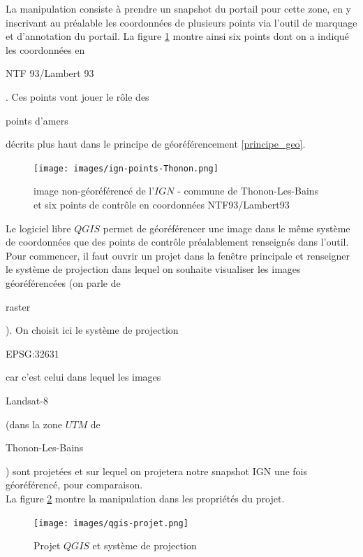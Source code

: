 \documentclass{book}
\begin{document}
\clearpage

La manipulation consiste à prendre un snapshot du portail pour cette zone, en y inscrivant au préalable les coordonnées de 
plusieurs points via l'outil de marquage et d'annotation du portail. La figure \ref{ign-points} montre ainsi six points 
dont on a indiqué les coordonnées en \begin{itshape}NTF 93/Lambert 93\end{itshape}. Ces points vont jouer le rôle des 
\begin{itshape}points d'amers\end{itshape} décrits plus haut dans le principe de géoréférencement \ref{principe_geo}.

\begin{figure}[H]
\begin{center}
\texttt{[image: images/ign-points-Thonon.png]}
\end{center}
\caption{image non-géoréférencé de l'$IGN$ - commune de Thonon-Les-Bains et six points de contr\^{o}le en coordonnées NTF93/Lambert93}
\label{ign-points}
\end{figure}

\clearpage

Le logiciel libre $QGIS$ \cite{QGIS_software} permet de géoréférencer une image dans le même système de coordonnées que des points de
contr\^{o}le préalablement renseignés dans l'outil.\\
Pour commencer, il faut ouvrir un projet dans la fen\^{e}tre principale et renseigner le système de projection dans lequel on souhaite visualiser
les images géoréférencées (on parle de \begin{itshape}raster\end{itshape}). On choisit ici le système de projection
\begin{itshape}EPSG:32631\end{itshape} car c'est celui dans lequel les images \begin{itshape}Landsat-8\end{itshape} (dans la zone $UTM$ 
de \begin{itshape}Thonon-Les-Bains\end{itshape}) sont projetées et
sur lequel on projetera notre snapshot IGN une fois géoréférencé, pour comparaison.\\
La figure \ref{qgis-projet} montre la manipulation dans les propriétés du projet.

\begin{figure}[H]
\begin{center}
\texttt{[image: images/qgis-projet.png]}
\end{center}
\caption{Projet $QGIS$ et système de projection}
\label{qgis-projet}
\end{figure}
\end{document}
